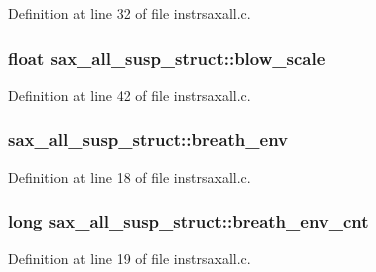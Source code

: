 Definition at line 32 of file instrsaxall.\+c.

\subsubsection[{\texorpdfstring{blow\+\_\+scale}{blow_scale}}]{\setlength{\rightskip}{0pt plus 5cm}float sax\+\_\+all\+\_\+susp\+\_\+struct\+::blow\+\_\+scale}\hypertarget{structsax__all__susp__struct_a988ee512eed882cd12bca7e3f5789b72}{}\label{structsax__all__susp__struct_a988ee512eed882cd12bca7e3f5789b72}


Definition at line 42 of file instrsaxall.\+c.

\subsubsection[{\texorpdfstring{breath\+\_\+env}{breath_env}}]{ sax\+\_\+all\+\_\+susp\+\_\+struct\+::breath\+\_\+env}\hypertarget{structsax__all__susp__struct_a8e1b745b0a3d1315c34a46e63ae605ce}{}\label{structsax__all__susp__struct_a8e1b745b0a3d1315c34a46e63ae605ce}


Definition at line 18 of file instrsaxall.\+c.

\subsubsection[{\texorpdfstring{breath\+\_\+env\+\_\+cnt}{breath_env_cnt}}]{\setlength{\rightskip}{0pt plus 5cm}long sax\+\_\+all\+\_\+susp\+\_\+struct\+::breath\+\_\+env\+\_\+cnt}\hypertarget{structsax__all__susp__struct_a3a50b9b9c108d3d64372ea587b16d9ff}{}\label{structsax__all__susp__struct_a3a50b9b9c108d3d64372ea587b16d9ff}


Definition at line 19 of file instrsaxall.\+c.

